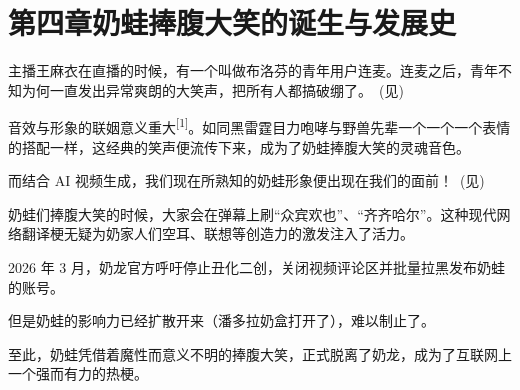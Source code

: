 
\clearpage
\section{第四章\quad 奶蛙捧腹大笑的诞生与发展史}

主播王麻衣在直播的时候，有一个叫做布洛芬的青年用户连麦。连麦之后，青年不知为何一直发出异常爽朗的大笑声，把所有人都搞破绷了。~(见)

音效与形象的联姻意义重大\textsuperscript{[1]}。如同黑雷霆目力咆哮与野兽先辈一个一个一个表情的搭配一样，这经典的笑声便流传下来，成为了奶蛙捧腹大笑的灵魂音色。



而结合 AI 视频生成，我们现在所熟知的奶蛙形象便出现在我们的面前！~(见)



奶蛙们捧腹大笑的时候，大家会在弹幕上刷“众宾欢也”、“齐齐哈尔”。这种现代网络翻译梗无疑为奶家人们空耳、联想等创造力的激发注入了活力。

2026 年 3 月，奶龙官方呼吁停止丑化二创，关闭视频评论区并批量拉黑发布奶蛙的账号。

但是奶蛙的影响力已经扩散开来（潘多拉奶盒打开了），难以制止了。

至此，奶蛙凭借着魔性而意义不明的捧腹大笑，正式脱离了奶龙，成为了互联网上一个强而有力的热梗。

\clearpage


